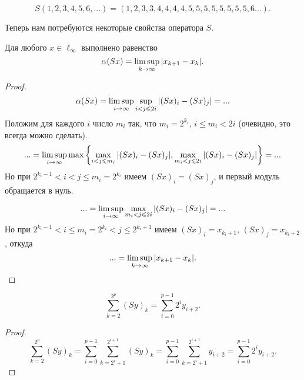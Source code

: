 \begin{example}
	$$
		S(1,2,3,4,5,6, ...) = (1,2,3,3,4,4,4,4,5,5,5,5,5,5,5,5,6...)
		.
	$$
\end{example}

Теперь нам потребуются некоторые свойства оператора $S$.

\begin{lemma}
	\label{thm:alpha_S}
	Для любого $x\in \ell_\infty$ выполнено равенство
	\begin{equation}\label{alpha_S}
		\alpha(Sx) = \varlimsup_{k\to\infty} |x_{k+1} - x_{k}|
		.
	\end{equation}
\end{lemma}

\begin{proof}
	\begin{equation*}
		\alpha(Sx) =
		\varlimsup_{i\to\infty} \sup_{i < j \leq 2i} | (Sx)_i - (Sx)_j | = ...
	\end{equation*}
	Положим для каждого $i$ число $m_i$ так,
	что $m_i = 2^{k_i}$, $i \leq m_i < 2i$
	(очевидно, это всегда можно сделать).
	\begin{equation*}
		... =
		\varlimsup_{i\to\infty} \max \left\{
			\max_{i   < j \leq m_i} | (Sx)_i - (Sx)_j |,
			\max_{m_i < j \leq 2i } | (Sx)_i - (Sx)_j |
		\right\} =
		...
	\end{equation*}
	Но при $2^{k_i - 1} < i < j \leq m_i = 2^{k_i}$
	имеем $(Sx)_i = (Sx)_j$, и первый модуль обращается в нуль.

	\begin{equation*}
		... =
		\varlimsup_{i\to\infty}
			\max_{m_i < j \leq 2i } | (Sx)_i - (Sx)_j |
		=
		...
	\end{equation*}
	Но при $2^{k_i - 1} < i \leq m_i = 2^{k_i} < j \leq 2^{k_i+1}$
	имеем $(Sx)_i = x_{k_i+1}$, $(Sx)_j = x_{k_i+2}$, откуда
	\begin{equation}\label{alpha_S_sosedi}
		... =
		\varlimsup_{k\to\infty}
			| x_{k+1} - x_k |
			.
	\end{equation}
\end{proof}


\begin{lemma}
	\begin{equation}\label{summa_S_less}
		\sum_{k=2}^{2^p} (Sy)_k =
		\sum_{i=0}^{p-1} 2^i y_{i+2}
		.
	\end{equation}
\end{lemma}

\begin{proof}
	\begin{equation*}
		\sum_{k=2}^{2^p} (Sy)_k =
		\sum_{i=0}^{p-1} \sum_{k=2^i+1}^{2^{i+1}} (Sy)_k =
		\sum_{i=0}^{p-1} \sum_{k=2^i+1}^{2^{i+1}} y_{i+2} =
		\sum_{i=0}^{p-1} 2^i y_{i+2}
		.
	\end{equation*}
\end{proof}



